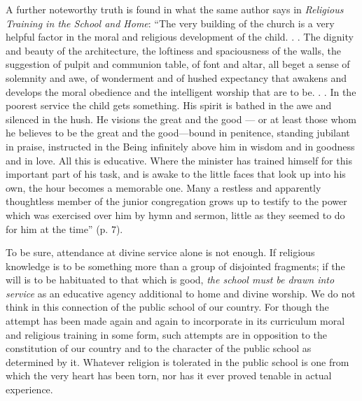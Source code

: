 A further noteworthy truth is found in what the same author says in \emph{Religious Training in the School and Home}: “The very building of the church is a very helpful factor in the moral and religious development of the child. . . The dignity and beauty of the architecture, the loftiness and spaciousness of the walls, the suggestion of pulpit and communion table, of font and altar, all beget a sense of solemnity
and awe, of wonderment and of hushed expectancy that awakens and develops the moral obedience and the intelligent worship that are to be. . . In the poorest service the child gets something. His spirit is bathed in the awe and silenced in the hush. He visions the great and the good — or at least those whom he believes to be the great and the good—bound in penitence, standing jubilant in praise, instructed in the Being infinitely above him in wisdom and in goodness and in love. All this is educative. Where the minister has trained himself for this important part of his task, and is awake to the little faces that look up into his own, the hour becomes a memorable one. Many a restless and apparently thoughtless member of the junior congregation grows up to testify to the power which was exercised over him by hymn and sermon, little as they seemed to do for him at the time” (p. 7).

To be sure, attendance at divine service alone is not enough. If religious knowledge is to be something more than a group of disjointed fragments; if the will is to be habituated to that which is good, \emph{the school must be drawn into service} as an educative agency additional to home and divine worship. We do not think in this connection of the public school of our country. For though the attempt has been made again and again to incorporate in its curriculum moral and religious training in some form, such attempts are in opposition to the constitution of our country and to the character of the public school as determined by it. Whatever religion is tolerated in the public school is one from which the very heart has been torn, nor has it ever proved tenable in actual experience.

